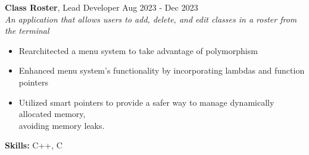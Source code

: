 \documentclass[letterpaper, 10pt]{article}
\newcommand{\secStartSpace}{\vspace{3pt}}
\newcommand{\secEndSpace}{\vspace{5pt}}
\begin{document}
\secStartSpace
\noindent \normalsize \textbf{Class Roster}, Lead Developer  \hfill \normalsize{Aug 2023 - Dec 2023}\\
\textit{An application that allows users to add, delete, and edit classes in a roster from the terminal}
\setlength \parindent{1cm} 
    \vspace{-5pt}
    \noindent \hspace{-10pt} \begin{itemize} 
        \item Rearchitected a menu system to take advantage of polymorphism
        \vspace{-6pt}
        \item Enhanced menu system's functionality by incorporating lambdas and function pointers
        \vspace{-6pt}
        \item Utilized smart pointers to provide a safer way to manage dynamically allocated memory, \\
        avoiding memory leaks.
    \end{itemize}
    \vspace{-4pt} \hspace{0pt}
    \textbf{Skills:}  C++, C
\secEndSpace



\end{document}
